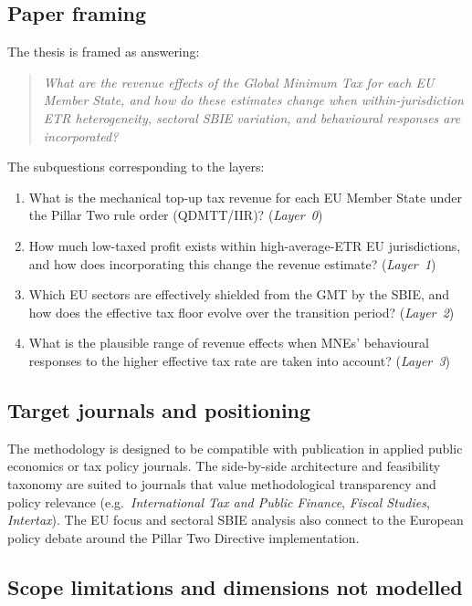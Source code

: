 \documentclass[11pt,a4paper]{article}
\begin{document}
\subsection{Paper framing}\label{sec:framing}

The thesis is framed as answering:

\begin{quote}
\textit{What are the revenue effects of the Global Minimum Tax for each EU Member State, and how do these estimates change when within-jurisdiction ETR heterogeneity, sectoral SBIE variation, and behavioural responses are incorporated?}
\end{quote}

The subquestions corresponding to the layers:

\begin{enumerate}
\item What is the mechanical top-up tax revenue for each EU Member State under the Pillar Two rule order (QDMTT/IIR)? (\emph{Layer~0})
\item How much low-taxed profit exists within high-average-ETR EU jurisdictions, and how does incorporating this change the revenue estimate? (\emph{Layer~1})
\item Which EU sectors are effectively shielded from the GMT by the SBIE, and how does the effective tax floor evolve over the transition period? (\emph{Layer~2})
\item What is the plausible range of revenue effects when MNEs' behavioural responses to the higher effective tax rate are taken into account? (\emph{Layer~3})
\end{enumerate}

\subsection{Target journals and positioning}\label{sec:positioning}

The methodology is designed to be compatible with publication in applied public economics or tax policy journals. The side-by-side architecture and feasibility taxonomy are suited to journals that value methodological transparency and policy relevance (e.g.\ \emph{International Tax and Public Finance}, \emph{Fiscal Studies}, \emph{Intertax}). The EU focus and sectoral SBIE analysis also connect to the European policy debate around the Pillar Two Directive implementation.

\subsection{Scope limitations and dimensions not modelled}\label{sec:scope_limits}
\end{document}
